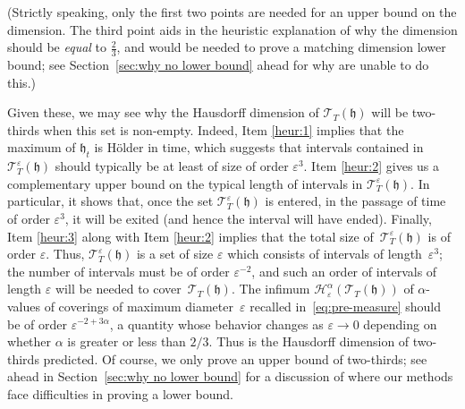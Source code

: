 \documentclass[oneside,final,11pt]{amsart}
\theoremstyle{definition}
\newcommand{\fh}{\mathfrak{h}}
\newcommand{\TPno}{\mathsf{TP}}
\newcommand{\CT}{\mathcal{T}}
\newcommand{\CH}{\mathcal{H}}
\newcommand{\1}[1]{\mathbf{1}_{#1}}
\newcommand{\eps}{\varepsilon}
\renewcommand{\epsilon}{\varepsilon}
\numberwithin{equation}{section}
\begin{document}
(Strictly speaking, only the first two points are needed for an upper bound on the dimension. The third point aids in the heuristic explanation of why the dimension should be \emph{equal} to $\frac{2}{3}$, and would be needed to prove a matching dimension lower bound; see Section~\ref{sec:why no lower bound} ahead for why are unable to do this.)%

Given these, we may see why the Hausdorff dimension of $\CT_T(\fh)$ will be two-thirds when this set is non-empty.
Indeed, Item \ref{heur:1} implies that the maximum of $\fh_t$ is H\"older  in time, which suggests that intervals contained in $\CT_T^\eps(\fh)$ should typically be at least of size of order $\eps^3$. Item \ref{heur:2} gives us a complementary upper bound on the typical length of intervals in $\CT_T^\eps(\fh)$. In particular, it shows that, once the set $\CT_T^\eps(\fh)$ is entered, in the passage of time of order $\eps^3$, it will be exited  (and hence the interval will have ended).
Finally, Item \ref{heur:3} along with Item \ref{heur:2} implies that the total size of~$\CT_T^\eps(\fh)$ is of order $\eps$. Thus, $\CT_T^\eps(\fh)$ is a set of size $\epsilon$
which consists of intervals of length~$\eps^3$; the number of intervals must be of order $\eps^{-2}$, and such an order of intervals of length $\epsilon$ will be needed to cover~$\CT_T(\fh)$.
%
The infimum $\CH^\alpha_\eps(\CT_T(\fh))$ of $\alpha$-values   of coverings of maximum diameter~$\eps$ recalled in~\eqref{eq:pre-measure} should be of order $\eps^{-2 + 3\alpha}$, a quantity whose behavior changes as $\eps\to0$ depending on whether $\alpha$ is greater or less than $2/3$. Thus is the Hausdorff dimension of two-thirds predicted. Of course, we only prove an upper bound of two-thirds; see ahead in Section~\ref{sec:why no lower bound} for a discussion of where our methods face difficulties in proving a lower bound.

\end{document}
